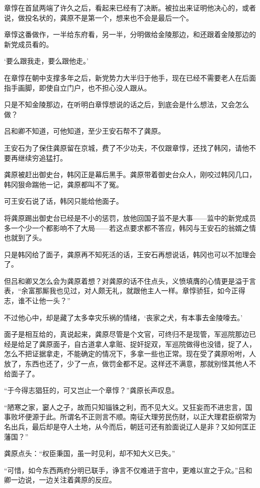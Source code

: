 章惇在首鼠两端了许久之后，看起来已经有了决断。被拉出来证明他决心的，或者说，做投名状的，龚原不是第一个，想来也不会是最后一个。

章惇这番做作，一半给东府看，另一半，分明做给金陵那边，和还跟着金陵那边的新党成员看的。

‘要么跟我走，要么跟他走。’

在章惇在朝中支撑多年之后，新党势力大半归于他手，现在已经不需要老人在后面指手画脚，即使自立门户，也不担心没人跟从。

只是不知金陵那边，在听明白章惇想说的话之后，到底会是什么想法，又会怎么做？

吕和卿不知道，可他知道，至少王安石帮不了龚原。

王安石为了保住龚原留在京城，费了不少功夫，不仅跟章惇，还找了韩冈，请他不要再继续穷追猛打。

龚原被赶出御史台，韩冈正是幕后黑手。龚原带着御史台众人，刚咬过韩冈几口，韩冈狠命踹他一记，龚原都叫不了冤。

可王安石说了话，韩冈只能给他面子。

将龚原踢出御史台已经是不小的惩罚，放他回国子监不是大事——监中的新党成员多一个少一个都影响不了大局——若这点要求都不答应，韩冈与王安石的翁婿之情也就到了头。

只是韩冈给了面子，龚原再不知死活的话，王安石再想说话，韩冈也可以不加理会了。

但吕和卿又怎么会为龚原着想？对龚原的话不住点头，义愤填膺的心情更是溢于言表，“余富那厮我也见过，对人颇无礼，就跟他主人一样。章惇骄狂，如今正得志，谁不让他一头？”

不过他心中，却是藏了太多幸灾乐祸的情绪，‘丧家之犬，有本事去金陵嚎去。’

面子是相互给的，真说起来，龚原尽管是个文官，可终归不是现管，军巡院那边已经是给足了龚原面子，自古道拿人拿赃、捉奸捉双，军巡院做得也没错，捉了人，怎么不把证据拿走，不能确定的情况下，多拿一些也正常。现在受了龚原吩咐，人放了，东西也还了，少了一点，做罚金都不足。这样还不满意，那就别怪其他人不给面子了。

“于今得志猖狂的，可又岂止一个章惇？”龚原长声叹息。

“陋寒之家，窭人之子，故而只知锱铢之利，而不见大义。又狂妄而不进忠言，国事败坏便源于此。所谓名不正则言不顺。南征大理劳民伤财，以正大理君臣纲常为名出兵，最后却是夺人土地，从今而后，朝廷可还有脸面说辽人是非？又如何匡正藩国？”

龚原点头：“权臣秉国，虽一时见利，却不知大义已失。”

“可惜，如今东西两府分明已联手，诤言不仅难进于宫中，更难以宣之于众。”吕和卿一边说，一边关注着龚原的反应。

